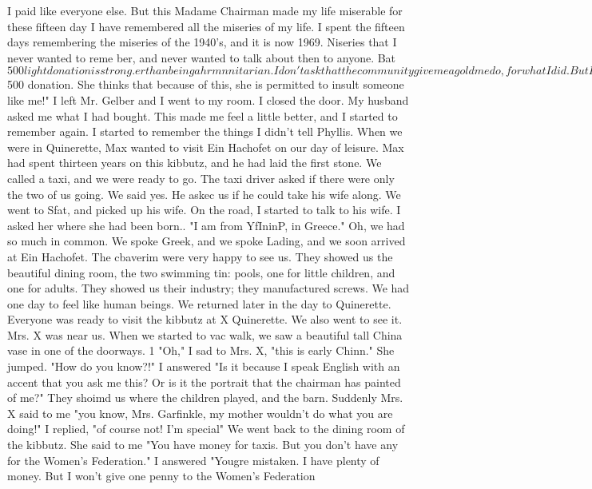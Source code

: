 {I paid like 
everyone else.
But this Madame Chairman made my life miserable for these fifteen day 
I have remembered all the miseries of my life.
I spent the fifteen days remembering 
the miseries of the 1940's, and it is now 1969.
Niseries that I never wanted to reme 
ber, and never wanted to talk about then to anyone.
Bat $500 light donation is strong.
er than being a hrmnnitarian.
I don't ask that the community give me a gold medo, for 
what I did.
But I will not let myself be insulted any more, especially when it is 
owing from some ignorant person because she gave SAR a $500 donation.
She thinks 
that because of this, she is permitted to insult someone like me!"
I left Mr.
Gelber and I went to my room.
I closed the door.
My husband asked 
me what I had bought.
This made me feel a little better, and I started to remember 
again.
I started to remember the things I didn't tell Phyllis.
When we were in Quinerette, 
Max wanted to visit Ein Hachofet on our day of leisure.
Max had spent thirteen years 
on this kibbutz, and he had laid the first stone.
We called a taxi, and we were ready to 
go.
The taxi driver asked if there were only the two of us going.
We said yes.
He askec 
us if he could take his wife along.
We went to Sfat, and picked up his wife.
On the road, I started to talk to his wife.
I asked her where she had been born.. 
"I am from YfIninP, in Greece."
Oh, we had so much in common.
We spoke Greek, and we 
spoke Lading, and we soon arrived at Ein Hachofet.
The cbaverim were very happy to see us.
They showed us the beautiful dining room, 
the two swimming tin: pools, one for little children, and one for adults.
They showed 
us their industry; they manufactured screws.
We had one day to feel like human beings.
We returned later in the day to Quinerette.
Everyone was ready to visit the kibbutz at X Quinerette.
We also went to see it.
Mrs.
X was near us.
When we started to vac walk, we saw a beautiful tall China vase in 
one of the doorways.
1 
"Oh," I sad to Mrs.
X, "this is early Chinn."
She jumped.
"How do you know?!"
I answered "Is it because I speak English with an accent that you ask me this?
Or 
is it the portrait that the chairman has painted of me?"
They shoimd us where the children played, and the barn.
Suddenly Mrs.
X said to me 
"you know, Mrs.
Garfinkle, my mother wouldn't do what you are doing!"
I replied, "of 
course not!
I'm special" 
We went back to the dining room of the kibbutz.
She said to me "You have money 
for taxis.
But you don't have any for the Women's Federation."
I answered "Yougre 
mistaken.
I have plenty of money.
But I won't give one penny to the Women's Federation 
}
